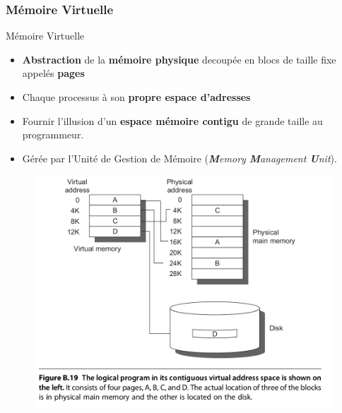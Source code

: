 \documentclass[8pt]{beamer}
\begin{document}
\begin{frame}
    \frametitle{Mémoire Virtuelle}
    \begin{block}{Mémoire Virtuelle}
        \begin{itemize}
            \item \textbf{Abstraction} de la \textbf{mémoire physique}
                  decoup\'ee en blocs de taille fixe appel\'es \textbf{pages}
            \item Chaque processus \`a son \textbf{propre espace d'adresses}
            \item Fournir l’illusion d’un \textbf{espace mémoire contigu} de
                  grande
                  taille au programmeur.
            \item Gérée par l'Unité de Gestion de Mémoire
                  (\emph{\textbf{M}emory
                      \textbf{M}anagement \textbf{U}nit}).
        \end{itemize}
    \end{block}
    \begin{figure}
        \centering

        \includegraphics[width=.5\textwidth]{figures/virtual_memory.png}
    \end{figure}

\end{frame}
\end{document}
